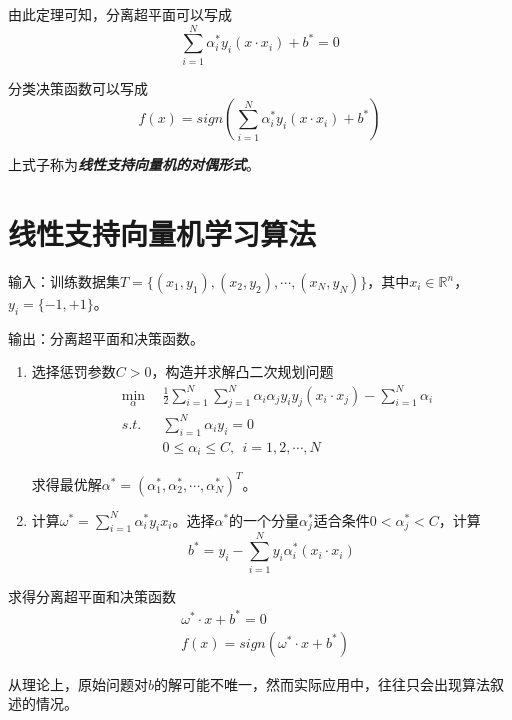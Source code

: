 由此定理可知，分离超平面可以写成
\begin{equation}
    \sum\limits_{i=1}^{N} \alpha^*_iy_i(x\cdot x_i)+b^*=0
\end{equation}

分类决策函数可以写成
\begin{equation}
    f(x)=sign(\sum\limits_{i=1}^{N} \alpha^*_iy_i(x\cdot x_i)+b^*)
\end{equation}

上式子称为\textsl{\textbf{线性支持向量机的对偶形式}}。

\section{线性支持向量机学习算法}

输入：训练数据集$T=\{(x_1,y_1),(x_2,y_2),\cdots,(x_N,y_N)\}$，其中$x_i\in \mathbb{R}^n$，$y_i=\{-1,+1\}$。

输出：分离超平面和决策函数。

\begin{enumerate}[itemindent=2em]
    \item 选择惩罚参数$C>0$，构造并求解凸二次规划问题
    \begin{eqnarray}
        & \min\limits_{\alpha} \ \ &\frac{1}{2}\sum\limits_{i=1}^{N}\sum\limits_{j=1}^{N}
        \alpha_i\alpha_jy_iy_j(x_i\cdot x_j)-\sum\limits_{i=1}^{N}\alpha_i\\
        & s.t. & \sum\limits_{i=1}^{N}\alpha_iy_i=0\\
        &      & 0\leqslant \alpha_i\leqslant C,\ \ i=1,2,\cdots,N
    \end{eqnarray}

    求得最优解$\alpha^*=(\alpha^*_1,\alpha^*_2,\cdots,\alpha^*_N)^T$。
    \item 计算$\omega^*=\sum\limits_{i=1}^{N}\alpha^*_iy_ix_i$。选择$\alpha^*$的一个分量$\alpha^*_j$适合条件$0<\alpha^*_j<C$，计算
    \begin{equation}
        b^*=y_i-\sum\limits_{i=1}^{N}y_i\alpha^*_i(x_i\cdot x_i)
    \end{equation}
\end{enumerate}

求得分离超平面和决策函数
\begin{eqnarray}
    & \omega^*\cdot x+b^*=0\\
    & f(x)=sign(\omega^*\cdot x+b^*)
\end{eqnarray}

从理论上，原始问题对$b$的解可能不唯一，然而实际应用中，往往只会出现算法叙述的情况。

